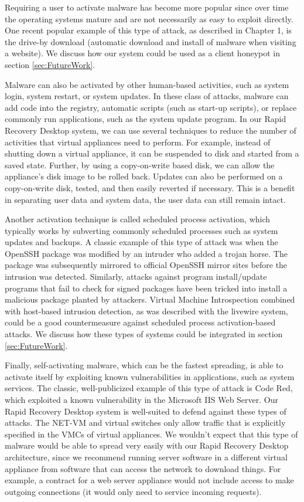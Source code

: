 Requiring a user to activate malware has become more popular since over time the operating systems mature and are not necessarily as easy to exploit directly. One recent popular example of this type of attack, as described in Chapter 1, is the drive-by download (automatic download and install of malware when visiting a website).  We discuss how our system could be used as a client honeypot in section \ref{sec:FutureWork}.

Malware can also be activated by other human-based activities, such as system login, system restart, or system updates. In these class of attacks, malware can add code into the registry, automatic scripts (such as start-up scripts), or replace commonly run applications, such as the system update program. In our Rapid Recovery Desktop system, we can use several techniques to reduce the number of activities that virtual appliances need to perform. For example, instead of shutting down a virtual appliance, it can be suspended to disk and started from a saved state. Further, by using a copy-on-write based disk, we can allow the appliance's disk image to be rolled back. Updates can also be performed on a copy-on-write disk, tested, and then easily reverted if necessary. This is a benefit in separating user data and system data, the user data can still remain intact.

Another activation technique is called scheduled process activation, which typically works by subverting commonly scheduled processes such as system updates and backups. A classic example of this type of attack was when the OpenSSH package was modified by an intruder who added a trojan horse\cite{openssh_trojan_2002}. The package was subsequently mirrored to official OpenSSH mirror sites before the intrusion was detected. Similarly, attacks against program install/update programs that fail to check for signed packages have been tricked into install a malicious package planted by attackers\cite{mac_vuln_2010}. Virtual Machine Introspection combined with host-based intrusion detection, as was described with the livewire system\cite{VMI_IDS_2003}, could be a good countermeasure against scheduled process activation-based attacks. We discuss how these types of systems could be integrated in section \ref{sec:FutureWork}.

Finally, self-activating malware, which can be the fastest spreading, is able to activate itself by exploiting known vulnerabilities in applications, such as system services. The classic, well-publicized example of this type of attack is Code Red, which exploited a known vulnerability in the Microsoft IIS Web Server. Our Rapid Recovery Desktop system is well-suited to defend against these types of attacks. The NET-VM and virtual switches only allow traffic that is explicitly specified in the VMCs of virtual appliances. We wouldn't expect that this type of malware would be able to spread very easily with our Rapid Recovery Desktop architecture, since we recommend running server software in a different virtual appliance from software that can access the network to download things. For example, a contract for a web server appliance would not include access to make outgoing connections (it would only need to service incoming requests).

